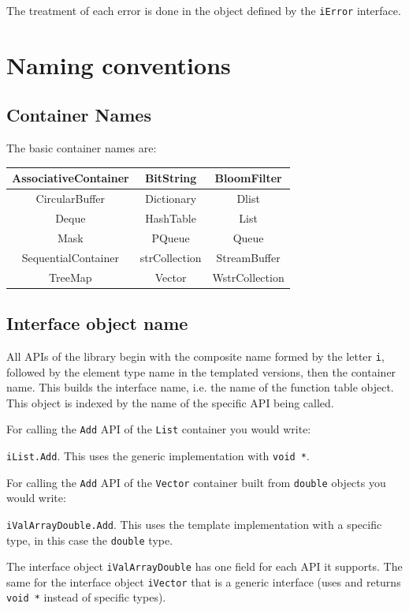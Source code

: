 \documentclass[12pt,a4paper]{memoir} %
\begin{document}
The treatment of each error is done in the object defined by the \texttt{iError} interface.

\section{Naming conventions}
\subsection{Container Names}
The basic container names are:
\begin{center}
\begin{tabular}{||c|c|c||}
\hline \hline
AssociativeContainer&BitString&BloomFilter\\\hline
CircularBuffer&Dictionary&Dlist\\\hline
Deque&HashTable&List\\\hline
Mask&PQueue&Queue\\\hline
SequentialContainer&strCollection&StreamBuffer\\\hline
TreeMap&Vector&WstrCollection\\\hline \hline
\end{tabular}
\end{center}
\subsection{Interface object name}
All APIs of the library begin with the composite name formed by the letter \verb,i,, followed by the element type name in the templated versions,
then the container name. This builds the interface name, i.e. the name of the function table object. This object is indexed by the name of the specific API being called. 

For calling the \verb,Add, API of the \verb,List, container you would write: \par
\verb,iList.Add,. This uses the generic implementation with \verb,void *,.

For calling the \verb,Add, API of the \verb,Vector, container built from \verb,double, objects you would write:
\par \verb,iValArrayDouble.Add,. This uses the template implementation with a specific type, in this case the \verb,double, type.

The interface object \verb,iValArrayDouble, has one field for each API it supports. The same for the interface object \verb,iVector, that is
a generic interface (uses and returns \verb,void *, instead of specific types). 
\end{document}
